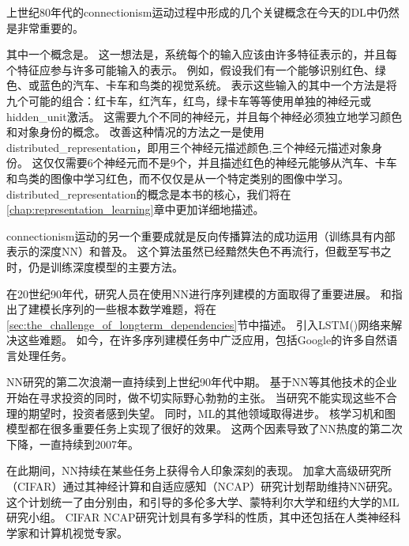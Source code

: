上世纪80年代的\gls{connectionism}运动过程中形成的几个关键概念在今天的\gls{DL}中仍然是非常重要的。

其中一个概念是\citep{Hinton-et-al-PDP1986}。
这一想法是，系统每个的输入应该由许多特征表示的，并且每个特征应参与许多可能输入的表示。
例如，假设我们有一个能够识别红色、绿色、或蓝色的汽车、卡车和鸟类的视觉系统。
表示这些输入的其中一个方法是将九个可能的组合：红卡车，红汽车，红鸟，绿卡车等等使用单独的神经元或\gls{hidden_unit}激活。
这需要九个不同的神经元，并且每个神经必须独立地学习颜色和对象身份的概念。
改善这种情况的方法之一是使用\gls{distributed_representation}，即用三个神经元描述颜色,三个神经元描述对象身份。 
这仅仅需要6个神经元而不是9个，并且描述红色的神经元能够从汽车、卡车和鸟类的图像中学习红色，而不仅仅是从一个特定类别的图像中学习。 
\gls{distributed_representation}的概念是本书的核心，我们将在\ref{chap:representation_learning}章中更加详细地描述。


\gls{connectionism}运动的另一个重要成就是反向传播算法的成功运用（训练具有内部表示的深度\gls{NN}）和普及\citep{RHW,Lecun-these87}。
这个算法虽然已经黯然失色不再流行，但截至写书之时，仍是训练深度模型的主要方法。

在20世纪90年代，研究人员在使用\gls{NN}进行序列建模的方面取得了重要进展。
\citet{Hochreiter91}和\citet{Bengio1994ITNN}指出了建模长序列的一些根本数学难题，将在\ref{sec:the_challenge_of_longterm_dependencies}节中描述。
\citet{Hochreiter+Schmidhuber-1997}引入\gls{LSTM}()网络来解决这些难题。
如今，在许多序列建模任务中广泛应用，包括Google的许多自然语言处理任务。

\gls{NN}研究的第二次浪潮一直持续到上世纪90年代中期。
基于\gls{NN}等其他技术的企业开始在寻求投资的同时，做不切实际野心勃勃的主张。
当研究不能实现这些不合理的期望时，投资者感到失望。
同时，\gls{ML}的其他领域取得进步。
核学习机\citep{Boser92,Cortes95,SchBurSmo99}和图模型\citep{Jordan98}都在很多重要任务上实现了很好的效果。
这两个因素导致了\gls{NN}热度的第二次下降，一直持续到2007年。

在此期间，\gls{NN}持续在某些任务上获得令人印象深刻的表现\citep{LeCun98-small,Bengio-nnlm2001}。
加拿大高级研究所（CIFAR）通过其神经计算和自适应感知（NCAP）研究计划帮助维持\gls{NN}研究。
这个计划统一了由分别由，和引导的多伦多大学、蒙特利尔大学和纽约大学的\gls{ML}研究小组。
CIFAR NCAP研究计划具有多学科的性质，其中还包括在人类神经科学家和计算机视觉专家。

